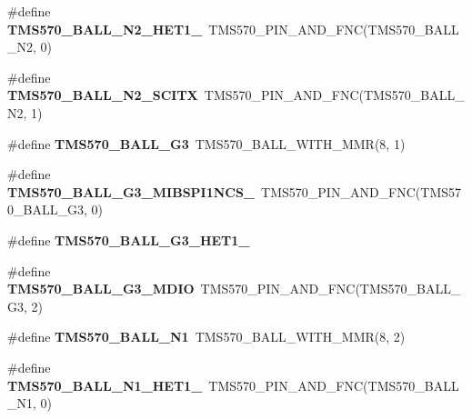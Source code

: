 \begin{DoxyCompactItemize}
\item 
\mbox{\label{tms570ls3137zwt-pins_8h_a7b9c4050f77e9876826240e9616c0240}} 
\#define {\bfseries T\+M\+S570\+\_\+\+B\+A\+L\+L\+\_\+\+N2\+\_\+\+H\+E\+T1\+\_}~T\+M\+S570\+\_\+\+P\+I\+N\+\_\+\+A\+N\+D\+\_\+\+F\+NC(T\+M\+S570\+\_\+\+B\+A\+L\+L\+\_\+\+N2, 0)
\item 
\mbox{\label{tms570ls3137zwt-pins_8h_a8456df9316beb0c120b1e3033176db2a}} 
\#define {\bfseries T\+M\+S570\+\_\+\+B\+A\+L\+L\+\_\+\+N2\+\_\+\+S\+C\+I\+TX}~T\+M\+S570\+\_\+\+P\+I\+N\+\_\+\+A\+N\+D\+\_\+\+F\+NC(T\+M\+S570\+\_\+\+B\+A\+L\+L\+\_\+\+N2, 1)
\item 
\mbox{\label{tms570ls3137zwt-pins_8h_a65a94c12e8d92a052183ad73616a081c}} 
\#define {\bfseries T\+M\+S570\+\_\+\+B\+A\+L\+L\+\_\+\+G3}~T\+M\+S570\+\_\+\+B\+A\+L\+L\+\_\+\+W\+I\+T\+H\+\_\+\+M\+MR(8, 1)
\item 
\mbox{\label{tms570ls3137zwt-pins_8h_ad175b01b70b065802d07c34ea0d43230}} 
\#define {\bfseries T\+M\+S570\+\_\+\+B\+A\+L\+L\+\_\+\+G3\+\_\+\+M\+I\+B\+S\+P\+I1\+N\+C\+S\+\_}~T\+M\+S570\+\_\+\+P\+I\+N\+\_\+\+A\+N\+D\+\_\+\+F\+NC(T\+M\+S570\+\_\+\+B\+A\+L\+L\+\_\+\+G3, 0)
\item 
\#define {\bfseries T\+M\+S570\+\_\+\+B\+A\+L\+L\+\_\+\+G3\+\_\+\+H\+E\+T1\+\_}
\item 
\mbox{\label{tms570ls3137zwt-pins_8h_a6100b467f7aca7fb8dac59d32a7a9241}} 
\#define {\bfseries T\+M\+S570\+\_\+\+B\+A\+L\+L\+\_\+\+G3\+\_\+\+M\+D\+IO}~T\+M\+S570\+\_\+\+P\+I\+N\+\_\+\+A\+N\+D\+\_\+\+F\+NC(T\+M\+S570\+\_\+\+B\+A\+L\+L\+\_\+\+G3, 2)
\item 
\mbox{\label{tms570ls3137zwt-pins_8h_ac53cc7a72d83a8eb47afbbcce43a0c06}} 
\#define {\bfseries T\+M\+S570\+\_\+\+B\+A\+L\+L\+\_\+\+N1}~T\+M\+S570\+\_\+\+B\+A\+L\+L\+\_\+\+W\+I\+T\+H\+\_\+\+M\+MR(8, 2)
\item 
\mbox{\label{tms570ls3137zwt-pins_8h_a9236aa9172874feefcbe818c6485de28}} 
\#define {\bfseries T\+M\+S570\+\_\+\+B\+A\+L\+L\+\_\+\+N1\+\_\+\+H\+E\+T1\+\_}~T\+M\+S570\+\_\+\+P\+I\+N\+\_\+\+A\+N\+D\+\_\+\+F\+NC(T\+M\+S570\+\_\+\+B\+A\+L\+L\+\_\+\+N1, 0)

\end{DoxyCompactItemize}
